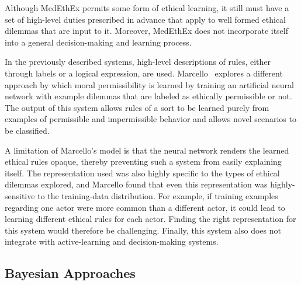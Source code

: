 \documentclass[11pt]{article}
\newcommand\jmnote[1]{\textcolor{red}{James: #1}}
\begin{document}
Although MedEthEx permits some form of ethical learning, it still must have a set of high-level duties prescribed in advance that apply to well formed ethical dilemmas that are input to it. Moreover, MedEthEx does not incorporate itself into a general decision-making and learning process.

In the previously described systems, high-level descriptions of rules, either through labels or a logical expression, are used. Marcello~ explores a different approach by which moral permissibility is learned by training an artificial neural network with example dilemmas that are labeled as ethically permissible or not. The output of this system allows rules of a sort to be learned purely from examples of permissible and impermissible behavior and allows novel scenarios to be classified. 

A limitation of Marcello's model is that the neural network renders the learned ethical rules opaque, thereby preventing such a system from easily explaining itself. The representation used was also highly specific to the types of ethical dilemmas explored, and Marcello found that even this representation was highly-sensitive to the training-data distribution. For example, if training examples regarding one actor were more common than a different actor, it could lead to learning different ethical rules for each actor. Finding the right representation for this system would therefore be challenging. Finally, this system also does not integrate with active-learning and decision-making systems. 


\subsection{Bayesian Approaches}
\end{document}
